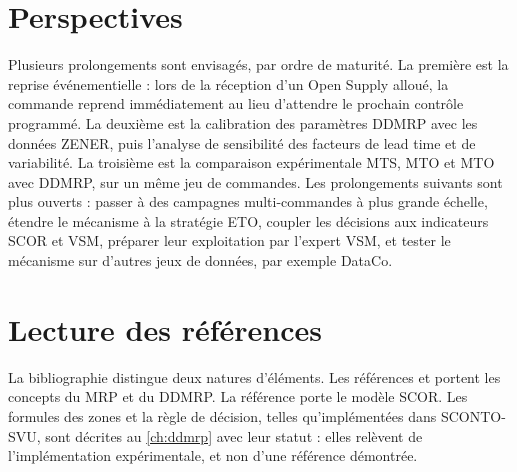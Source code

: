 \section{Perspectives}

Plusieurs prolongements sont envisagés, par ordre de maturité. La première est la reprise
événementielle : lors de la réception d'un Open Supply alloué, la commande reprend immédiatement au lieu
d'attendre le prochain contrôle programmé. La deuxième est la calibration des paramètres DDMRP avec les
données ZENER, puis l'analyse de sensibilité des facteurs de lead time et de variabilité. La troisième
est la comparaison expérimentale MTS, MTO et MTO avec DDMRP, sur un même jeu de commandes. Les
prolongements suivants sont plus ouverts : passer à des campagnes multi-commandes à plus grande échelle,
étendre le mécanisme à la stratégie ETO, coupler les décisions aux indicateurs SCOR et VSM, préparer
leur exploitation par l'expert VSM, et tester le mécanisme sur d'autres jeux de données, par exemple
DataCo.

\section{Lecture des références}

La bibliographie distingue deux natures d'éléments. Les références \cite{orlicky} et \cite{ptak} portent
les concepts du MRP et du DDMRP. La référence \cite{apics2017} porte le modèle SCOR. Les formules des
zones et la règle de décision, telles qu'implémentées dans SCONTO-SVU, sont décrites au
\cref{ch:ddmrp} avec leur statut : elles relèvent de l'implémentation expérimentale, et non d'une
référence démontrée.
